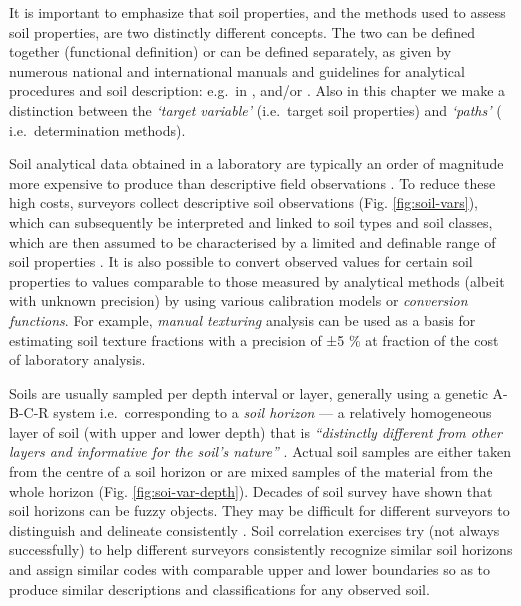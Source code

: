 \documentclass[11pt]{krantz}
\theoremstyle{definition}
\theoremstyle{definition}
\theoremstyle{definition}
\theoremstyle{remark}
\begin{document}
It is important to emphasize that soil properties, and the methods used
to assess soil properties, are two distinctly different concepts. The
two can be defined together (functional definition) or can be defined
separately, as given by numerous national and international manuals and
guidelines for analytical procedures and soil description: e.g.~in
\citeauthor{Burt2004SSIR}
\citetext{\citeyear{Burt2004SSIR}; \citealp{carter2007soil}; \citealp{food2006guidelines}},
and/or \citet{VanReeuwijk2002}. Also in this chapter we make a
distinction between the \emph{`target variable'} (i.e.~target soil
properties) and \emph{`paths'} ( i.e.~determination methods).

Soil analytical data obtained in a laboratory are typically an order of
magnitude more expensive to produce than descriptive field observations
\citep{Burrough1971, GehlRice2005, Kempen2011PhDthesis}. To reduce these
high costs, surveyors collect descriptive soil observations (Fig.
\ref{fig:soil-vars}), which can subsequently be interpreted and linked
to soil types and soil classes, which are then assumed to be
characterised by a limited and definable range of soil properties
\citep{bouma1998exploring}. It is also possible to convert observed
values for certain soil properties to values comparable to those
measured by analytical methods (albeit with unknown precision) by using
various calibration models or \emph{conversion functions}. For example,
\emph{manual texturing} analysis \citep{FAO1990, SSDS1993} can be used
as a basis for estimating soil texture fractions with a precision of ±5
\% at fraction of the cost of laboratory analysis.

Soils are usually sampled per depth interval or layer, generally using a
genetic A-B-C-R system i.e.~corresponding to a \emph{soil horizon} --- a
relatively homogeneous layer of soil (with upper and lower depth) that
is \emph{``distinctly different from other layers and informative for
the soil's nature''} \citep{harpstead2001soil}. Actual soil samples are
either taken from the centre of a soil horizon or are mixed samples of
the material from the whole horizon (Fig. \ref{fig:soi-var-depth}).
Decades of soil survey have shown that soil horizons can be fuzzy
objects. They may be difficult for different surveyors to distinguish
and delineate consistently
\citep{Burrough1989JSS, DeGruijter1997Geoderma}. Soil correlation
exercises try (not always successfully) to help different surveyors
consistently recognize similar soil horizons and assign similar codes
with comparable upper and lower boundaries so as to produce similar
descriptions and classifications for any observed soil.
\end{document}

